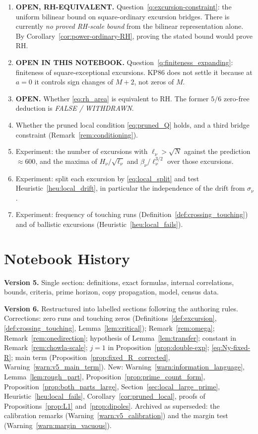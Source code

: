 \documentclass[11pt]{amsart}
\numberwithin{equation}{section}
\theoremstyle{plain}
\theoremstyle{definition}
\theoremstyle{remark}
\begin{document}
\begin{enumerate}[label=\textup{(\arabic*)}]
\item \textbf{OPEN, RH-EQUIVALENT.} Question~\ref{q:excursion-constraint}:
the uniform bilinear bound on square-ordinary excursion bridges. There is
currently \emph{no proved RH-scale bound} from the bilinear representation
alone. By Corollary~\ref{cor:power-ordinary-RH}, proving the stated bound
would prove RH.
\item \textbf{OPEN IN THIS NOTEBOOK.} Question~\ref{q:finiteness_expanding}:
finiteness of square-exceptional excursions. KP86 does not settle it because
at $a=0$ it controls sign changes of $M+2$, not zeros of $M$.
\item \textbf{OPEN.} Whether \eqref{eq:rh_area} is equivalent to RH.
The former $5/6$ zero-free deduction is \emph{FALSE / WITHDRAWN}.
\item Whether the pruned local condition \eqref{eq:pruned_Q} holds, and a
third bridge constraint (Remark~\ref{rem:conditioning}).
\item Experiment: the number of excursions with $\ell_\nu>\sqrt N$ against the
prediction $\approx600$, and the maxima of $H_\nu/\sqrt{\ell_\nu}$ and
$\beta_\nu/\ell_\nu^{3/2}$ over those excursions.
\item Experiment: split each excursion by \eqref{eq:local_split} and test
Heuristic~\ref{heu:local_drift}, in particular the independence of the drift
from $\sigma_\nu$.
\item Experiment: frequency of touching runs (Definition~\ref{def:crossing_touching})
and of ballistic excursions (Heuristic~\ref{heu:local_fails}).
\end{enumerate}

\section*{Notebook History}
\label{sec:history}

\noindent\textbf{Version 5.} Single section: definitions, exact formulas,
internal correlations, bounds, criteria, prime horizon, copy propagation,
model, census data.

\medskip
\noindent\textbf{Version 6.} Restructured into labelled sections following
the authoring rules. Corrections: zero runs and touching zeros
(Definitions~\ref{def:excursion}, \ref{def:crossing_touching},
Lemma~\ref{lem:critical}); Remark~\ref{rem:omega};
Remark~\ref{rem:onedirection}; hypothesis of Lemma~\ref{lem:transfer};
constant in Remark~\ref{rem:chowla-scale}; $j=1$ in
Proposition~\ref{prop:double-exp}; \eqref{eq:Ny-fixed-R}; main term
(Proposition~\ref{prop:fixed_R_corrected}, Warning~\ref{warn:v5_main_term}).
New: Warning~\ref{warn:information_language}, Lemma~\ref{lem:rough_part},
Proposition~\ref{prop:prime_count_form},
Proposition~\ref{prop:both_parts_large},
Section~\ref{sec:local_large_prime}, Heuristic~\ref{heu:local_fails},
Corollary~\ref{cor:pruned_local}, proofs of
Propositions~\ref{prop:L1} and~\ref{prop:dipoles}. Archived as superseded:
the calibration remarks (Warning~\ref{warn:v5_calibration}) and the margin
test (Warning~\ref{warn:margin_vacuous}).
\end{document}
